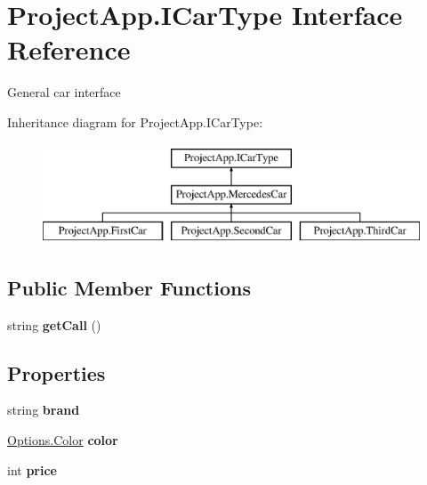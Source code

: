 \hypertarget{interface_project_app_1_1_i_car_type}{}\section{Project\+App.\+I\+Car\+Type Interface Reference}
\label{interface_project_app_1_1_i_car_type}


General car interface  


Inheritance diagram for Project\+App.\+I\+Car\+Type\+:\begin{figure}[H]
\begin{center}
\leavevmode
\includegraphics[height=3.000000cm]{interface_project_app_1_1_i_car_type}
\end{center}
\end{figure}
\subsection*{Public Member Functions}
\begin{DoxyCompactItemize}
\item 
\mbox{\label{interface_project_app_1_1_i_car_type_ab6f2d731bb49356d5db768a08d70fb58}} 
string {\bfseries get\+Call} ()
\end{DoxyCompactItemize}
\subsection*{Properties}
\begin{DoxyCompactItemize}
\item 
\mbox{\label{interface_project_app_1_1_i_car_type_a6fca24db93c98fa5ccf0340e3073024e}} 
string {\bfseries brand}
\item 
\mbox{\label{interface_project_app_1_1_i_car_type_ad293fd7683ea48ee0d84413575e8d90f}} 
\mbox{\hyperlink{class_project_app_1_1_options_aaa68b08af20deeebf73e6bc6de725c44}{Options.\+Color}} {\bfseries color}
\item 
\mbox{\label{interface_project_app_1_1_i_car_type_a4c1d0cd9be35340cffd1e51b1a3bac61}} 
int {\bfseries price}
\end{DoxyCompactItemize}


